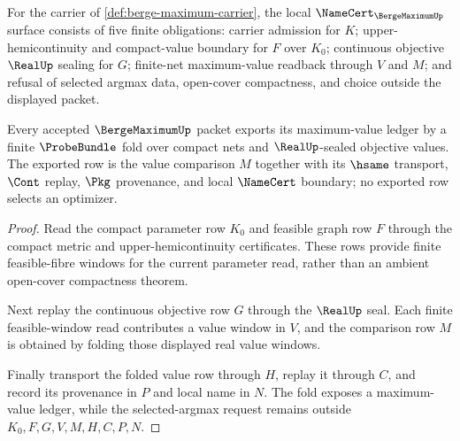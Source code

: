 \begin{theorem}
\label{thm:berge-maximum-namecert-obligations}
For the carrier of \autoref{def:berge-maximum-carrier}, the local $\NameCert_{\BergeMaximumUp}$ surface consists of five finite obligations: carrier admission for $K$; upper-hemicontinuity and compact-value boundary for $F$ over $K_0$; continuous objective $\RealUp$ sealing for $G$; finite-net maximum-value readback through $V$ and $M$; and refusal of selected argmax data, open-cover compactness, and choice outside the displayed packet.
\end{theorem}

\begin{theorem}
\label{thm:berge-maximum-finite-net-attainment}
Every accepted $\BergeMaximumUp$ packet exports its maximum-value ledger by a finite $\ProbeBundle$ fold over compact nets and $\RealUp$-sealed objective values. The exported row is the value comparison $M$ together with its $\hsame$ transport, $\Cont$ replay, $\Pkg$ provenance, and local $\NameCert$ boundary; no exported row selects an optimizer.
\end{theorem}
\begin{proof}
Read the compact parameter row $K_0$ and feasible graph row $F$ through the compact metric and upper-hemicontinuity certificates. These rows provide finite feasible-fibre windows for the current parameter read, rather than an ambient open-cover compactness theorem.

Next replay the continuous objective row $G$ through the $\RealUp$ seal. Each finite feasible-window read contributes a value window in $V$, and the comparison row $M$ is obtained by folding those displayed real value windows.

Finally transport the folded value row through $H$, replay it through $C$, and record its provenance in $P$ and local name in $N$. The fold exposes a maximum-value ledger, while the selected-argmax request remains outside $K_0,F,G,V,M,H,C,P,N$.
\end{proof}


